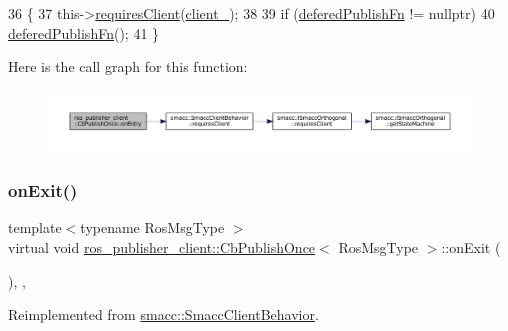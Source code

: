 \begin{DoxyCode}
36     \{
37         this->\hyperlink{classsmacc_1_1SmaccClientBehavior_a917f001e763a1059af337bf4e164f542}{requiresClient}(\hyperlink{classros__publisher__client_1_1CbPublishOnce_a50a1b2a4892ad780406231e0f870746a}{client\_});
38 
39         \textcolor{keywordflow}{if} (\hyperlink{classros__publisher__client_1_1CbPublishOnce_a91e0e3d574d25e160bcb3a4ca81bb0b2}{deferedPublishFn} != \textcolor{keyword}{nullptr})
40             \hyperlink{classros__publisher__client_1_1CbPublishOnce_a91e0e3d574d25e160bcb3a4ca81bb0b2}{deferedPublishFn}();
41     \}
\end{DoxyCode}
Here is the call graph for this function\+:
\nopagebreak
\begin{figure}[H]
\begin{center}
\leavevmode
\includegraphics[width=350pt]{classros__publisher__client_1_1CbPublishOnce_a223cb50cd7e4041d42106eb600575bae_cgraph}
\end{center}
\end{figure}
\mbox{\label{classros__publisher__client_1_1CbPublishOnce_a879c967bb3e5e894e61256629636fcbd}} 
\subsubsection{\texorpdfstring{on\+Exit()}{onExit()}}
{\footnotesize\ttfamily template$<$typename Ros\+Msg\+Type $>$ \\
virtual void \hyperlink{classros__publisher__client_1_1CbPublishOnce}{ros\+\_\+publisher\+\_\+client\+::\+Cb\+Publish\+Once}$<$ Ros\+Msg\+Type $>$\+::on\+Exit (\begin{DoxyParamCaption}{ }\end{DoxyParamCaption})\hspace{0.3cm}{\ttfamily [inline]}, {\ttfamily [override]}, {\ttfamily [virtual]}}



Reimplemented from \hyperlink{classsmacc_1_1SmaccClientBehavior_ac0cd72d42bd00425362a97c9803ecce5}{smacc\+::\+Smacc\+Client\+Behavior}.



